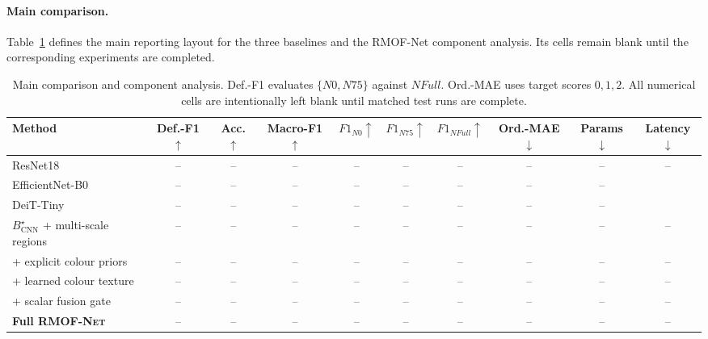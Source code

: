 \documentclass[conference]{IEEEtran}
\newcommand{\rmofnet}{\textsc{RMOF-Net}\xspace}
\newcommand{\selectedcnn}{B^{\star}_{\mathrm{CNN}}}
\newcommand{\pending}{--}
\begin{document}
\paragraph{Main comparison.}
Table~\ref{tab:main-results} defines the main reporting layout for the three baselines and the RMOF-Net component analysis. Its cells remain blank until the corresponding experiments are completed.
\begin{table}[!t]
\centering
\caption{Main comparison and component analysis. Def.-F1 evaluates $\{N0,N75\}$ against $NFull$. Ord.-MAE uses target scores $0,1,2$. All numerical cells are intentionally left blank until matched test runs are complete.}
\label{tab:main-results}
\setlength{\tabcolsep}{3.0pt}
\begin{adjustbox}{max width=\textwidth}
\begin{tabular}{lccccccccc}
\toprule
Method & Def.-F1$\uparrow$ & Acc.$\uparrow$ & Macro-F1$\uparrow$ & $F1_{N0}\uparrow$ & $F1_{N75}\uparrow$ & $F1_{NFull}\uparrow$ & Ord.-MAE$\downarrow$ & Params$\downarrow$ & Latency$\downarrow$ \\
\midrule
ResNet18 \cite{he2016resnet} & \pending & \pending & \pending & \pending & \pending & \pending & \pending & \pending & \pending \\
EfficientNet-B0 \cite{tan2019efficientnet} & \pending & \pending & \pending & \pending & \pending & \pending & \pending & \pending \\
DeiT-Tiny \cite{touvron2021deit} & \pending & \pending & \pending & \pending & \pending & \pending & \pending & \pending \\
\midrule
$\selectedcnn$ + multi-scale regions & \pending & \pending & \pending & \pending & \pending & \pending & \pending & \pending & \pending \\
\quad + explicit colour priors & \pending & \pending & \pending & \pending & \pending & \pending & \pending & \pending & \pending \\
\quad + learned colour texture & \pending & \pending & \pending & \pending & \pending & \pending & \pending & \pending & \pending \\
\quad + scalar fusion gate & \pending & \pending & \pending & \pending & \pending & \pending & \pending & \pending & \pending \\
\textbf{Full \rmofnet} & \pending & \pending & \pending & \pending & \pending & \pending & \pending & \pending & \pending \\
\bottomrule
\end{tabular}
\end{adjustbox}
\end{table}
\end{document}
